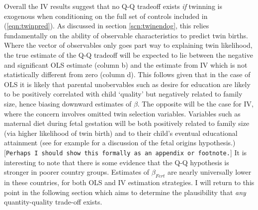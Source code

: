 \documentclass{article}[11pt,subeqn]
\begin{document}
\begin{spacing}{1.5}
Overall the IV results suggest that no Q-Q tradeoff exists \emph{if} twinning is exogenous when conditioning on the full set of controls included in (\ref{eqn:twinpred}).  As 
discussed in section \ref{scn:twinendog}, this relies fundamentally on the ability of observable characteristics to predict twin births.  Where the vector of observables only goes
part way to explaining twin likelihood, the true estimate of the Q-Q tradeoff will be expected to lie between the negative and significant OLS estimate (column b) and the estimate 
from IV which is not statistically different from zero (column d).  This follows given that in the case of OLS it is likely that parental unobervables such as desire for education are likely to be positively correlated with child `quality' but negatively related to family size, hence biasing downward estimates of $\beta$.  The opposite will be the case for IV, where the concern involves omitted twin selection variables.  Variables such as maternal diet during fetal gestation will be both positively related to family size (via higher likelihood of twin birth) and to their child's eventual educational attainment (see for example \citet{Barker1995} for a discussion of the fetal origins hypothesis.)  [\texttt{Perhaps I should show this formally as an appendix or footnote.}]  It is interesting to note that there is some evidence that the Q-Q hypothesis is stronger in poorer country groups.  Estimates of $\beta_{Fert}$ are nearly universally lower in these countries, for both OLS and IV estimation strategies.  I will return to this point in the following section which aims to determine the plausibility that \emph{any} quantity-quality trade-off exists.




\end{spacing}
\end{document}
